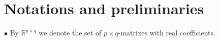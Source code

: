 \documentclass{article}
\theoremstyle{definition}
\theoremstyle{remark}
\newcommand{\R}{\mathbb{R}}
\newcommand{\R}{{\mathbb{R}}}
\begin{document}
\section{Notations and preliminaries} \noindent$\bullet$ By
$\R^{p\times q}$ we denote the set of $p\times q$-matrixes with real
coefficients.


\end{document}

